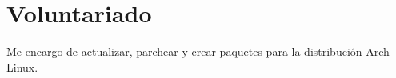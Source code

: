 \documentclass[10pt, a4paper]{moderncv}
\begin{document}
\section{Voluntariado}
{
	Me encargo de actualizar, parchear y crear paquetes para la distribución
	Arch Linux.
}

\end{document}
